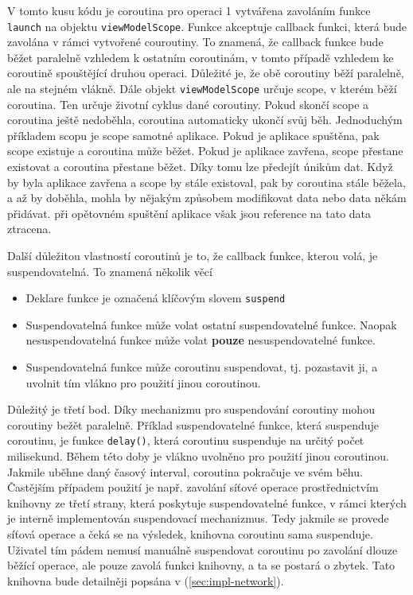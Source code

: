 \noindent V tomto kusu kódu je coroutina pro operaci 1 vytvářena zavoláním funkce \lstinline|launch| na objektu \lstinline|viewModelScope|. Funkce akceptuje callback funkci, která bude zavolána v rámci vytvořené couroutiny. To znamená, že callback funkce bude běžet paralelně vzhledem k ostatním  coroutinám, v tomto případě vzhledem ke coroutině spouštějící druhou operaci. Důležité je, že obě coroutiny běží paralelně, ale na stejném vlákně. Dále objekt \lstinline|viewModelScope| určuje scope, v kterém běží coroutina. Ten určuje životní cyklus dané coroutiny. Pokud skončí scope a coroutina ještě nedoběhla, coroutina automaticky ukončí svůj běh. Jednoduchým příkladem scopu je scope samotné aplikace. Pokud je aplikace spuštěna, pak scope existuje a coroutina může běžet. Pokud je aplikace zavřena, scope přestane existovat a coroutina přestane běžet. Díky tomu lze předejít únikům dat. Když by byla aplikace zavřena a scope by stále existoval, pak by coroutina stále \linebreak běžela, a až by doběhla, mohla by nějakým způsobem modifikovat data nebo data někám přidávat. při opětovném spuštění aplikace však jsou reference na tato data ztracena.

Další důležitou vlastností coroutinů je to, že callback funkce, kterou volá, je suspendovatelná. To znamená několik věcí

\begin{itemize}
	\item Deklare funkce je označená klíčovým slovem \lstinline|suspend|
	\item Suspendovatelná funkce může volat ostatní suspendovatelné funkce. Naopak nesuspendovatelná funkce může volat \textbf{pouze} nesuspendovatelné funkce.
	\item Suspendovatelná funkce může coroutinu suspendovat, tj. pozastavit ji, a uvolnit tím vlákno pro použití jinou coroutinou.
\end{itemize}

\noindent Důležitý je třetí bod. Díky mechanizmu pro suspendování coroutiny mohou coroutiny bežět paralelně. Příklad suspendovatelné funkce, která suspenduje coroutinu, je funkce \lstinline|delay()|, která coroutinu suspenduje na určitý počet milisekund. Během této doby je vlákno uvolněno pro použití jinou coroutinou. Jakmile uběhne daný časový interval, coroutina pokračuje ve svém běhu. Častějším případem použití je např. zavolání síťové operace prostřednictvím knihovny ze třetí \linebreak strany, která poskytuje suspendovatelné funkce, v rámci kterých je interně implementován suspendovací mechanizmus. Tedy jakmile se provede síťová operace a čeká se na výsledek, knihovna coroutinu sama suspenduje. Uživatel tím pádem nemusí manuálně suspendovat coroutinu po zavolání dlouze běžící operace, ale pouze zavolá funkci knihovny, a ta se postará o zbytek. Tato knihovna bude detailněji popsána v (\ref{sec:impl-network}).

